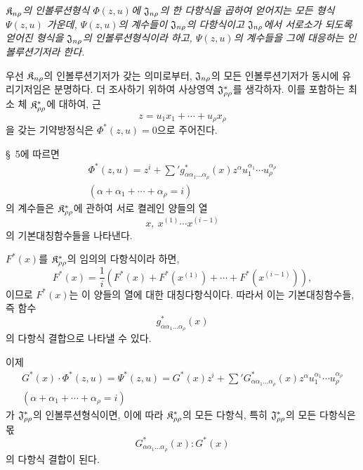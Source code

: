 \emph{$\mathfrak K_{n\rho}$의 인볼루션형식 $\Phi(z,u)$에 $\mathfrak J_{n\rho}$의 한 다항식을 곱하여 얻어지는 모든 형식 $\Psi(z,u)$ 가운데, $\Psi(z,u)$의 계수들이 $\mathfrak J_{n\rho}$의 다항식이고 $\mathfrak J_{n\rho}$에서 서로소가 되도록 얻어진 형식을 $\mathfrak J_{n\rho}$의 인볼루션형식이라 하고, $\Psi(z,u)$의 계수들을 그에 대응하는 인볼루션기저라 한다.}

우선 $\mathfrak K_{n\rho}$의 인볼루션기저가 갖는 의미로부터, $\mathfrak J_{n\rho}$의 모든 인볼루션기저가 동시에 유리기저임은 분명하다. 더 조사하기 위하여 사상영역 $\mathfrak J^*_{\rho\rho}$를 생각하자. 이를 포함하는 최소 체 $\mathfrak K^*_{\rho\rho}$에 대하여, 근
\[
z=u_1x_1+\cdots+u_\rho x_\rho
\]
을 갖는 기약방정식은 $\Phi^*(z,u)=0$으로 주어진다.

\S\ 5에 따르면
\[
\begin{gathered}
\Phi^*(z,u)=z^i+\sum{}'g^*_{\alpha\alpha_1\ldots\alpha_\rho}(x)z^\alpha u_1^{\alpha_1}\cdots u_\rho^{\alpha_\rho}\\
(\alpha+\alpha_1+\cdots+\alpha_\rho=i)
\end{gathered}
\]
의 계수들은 $\mathfrak K^*_{\rho\rho}$에 관하여 서로 켤레인 양들의 열
\[
x,\ x^{(1)}\cdots x^{(i-1)}
\]
의 기본대칭함수들을 나타낸다.

$F^*(x)$를 $\mathfrak K^*_{\rho\rho}$의 임의의 다항식이라 하면,
\[
F^*(x)=\frac1i\left(F^*(x)+F^*(x^{(1)})+\cdots+F^*(x^{(i-1)})\right),
\]
이므로 $F^*(x)$는 이 양들의 열에 대한 대칭다항식이다. 따라서 이는 기본대칭함수들, 즉 함수
\[
g^*_{\alpha\alpha_1\ldots\alpha_\rho}(x)
\]
의 다항식 결합으로 나타낼 수 있다.

이제
\[
\begin{gathered}
G^*(x)\cdot\Phi^*(z,u)=\Psi^*(z,u)=G^*(x)z^i+
\sum{}'G^*_{\alpha\alpha_1\ldots\alpha_\rho}(x)z^\alpha u_1^{\alpha_1}\cdots u_\rho^{\alpha_\rho}\\
(\alpha+\alpha_1+\cdots+\alpha_\rho=i)
\end{gathered}
\]
가 $\mathfrak J^*_{\rho\rho}$의 인볼루션형식이면, 이에 따라 $\mathfrak K^*_{\rho\rho}$의 모든 다항식, 특히 $\mathfrak J^*_{\rho\rho}$의 모든 다항식은 몫
\[
G^*_{\alpha\alpha_1\ldots\alpha_\rho}(x):G^*(x)
\]
의 다항식 결합이 된다.

